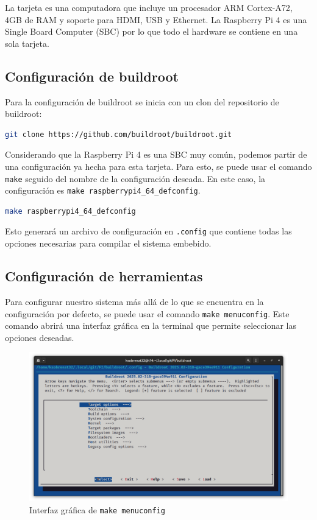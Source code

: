 \documentclass[12pt, letterpaper]{article}
\begin{document}
	La tarjeta es una computadora que incluye un procesador ARM Cortex-A72, 4GB de RAM y soporte para HDMI, USB y Ethernet. La Raspberry Pi 4 es una Single Board Computer (SBC) por lo que todo el hardware se contiene en una sola tarjeta.

	\subsection{Configuración de buildroot}

	Para la configuración de buildroot se inicia con un clon del repositorio de buildroot:

	\begin{lstlisting}[language=bash]
		git clone https://github.com/buildroot/buildroot.git
	\end{lstlisting}

	Considerando que la Raspberry Pi 4 es una SBC muy común, podemos partir de una configuración ya hecha para esta tarjeta. Para esto, se puede usar el comando \texttt{make} seguido del nombre de la configuración deseada. En este caso, la configuración es \texttt{make raspberrypi4\_64\_defconfig}.

	\begin{lstlisting}[language=bash]
		make raspberrypi4_64_defconfig
	\end{lstlisting}

	Esto generará un archivo de configuración en \texttt{.config} que contiene todas las opciones necesarias para compilar el sistema embebido.

	\subsection{Configuración de herramientas}

	Para configurar nuestro sistema más allá de lo que se encuentra en la configuración por defecto, se puede usar el comando \texttt{make menuconfig}. Este comando abrirá una interfaz gráfica en la terminal que permite seleccionar las opciones deseadas.

	\begin{figure}[H]
		\centering
		\begin{center}
			\includegraphics[width=\textwidth]{img/make-menuconfig-01}
			\caption{Interfaz gráfica de \texttt{make menuconfig}}
			\label{fig:make-menuconfig-01}
		\end{center}
	\end{figure}
\end{document}
